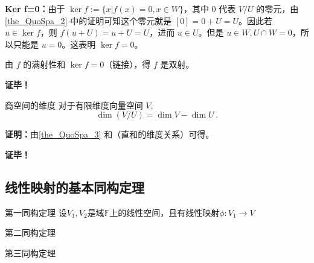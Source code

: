 \textbf{Ker f=0：}由于 $\ker f:=\{x|f(x)=0,x\in W\}$，其中 $0$ 代表 $V/U$ 的零元，由\autoref{the_QuoSpa_2} 中的证明可知这个零元就是 $[0]=0+U=U$。因此若 $u\in\ker f$，则 $f(u+U)=u+U=U$，进而 $u\in U$。但是 $u\in W,U\cap W=0$，所以只能是 $u=0$。这表明 $\ker f=0$。

由 $f$ 的满射性和 $\ker f=0$（链接），得 $f$ 是双射。

\textbf{证毕！}

\begin{corollary}{商空间的维度}
对于有限维度向量空间 $V$,
\begin{equation}\label{eq_QuoSpa_2}
\dim(V/U) = \dim V - \dim U~.
\end{equation}
\end{corollary}

\textbf{证明：}由\autoref{the_QuoSpa_3} 和（直和的维度关系）可得。

\textbf{证毕！}
\subsection{线性映射的基本同构定理}
\begin{theorem}{第一同构定理}
设$V_1,V_2$是域$\mathbb F$上的线性空间，且有线性映射$\phi:V_1\rightarrow V$
\end{theorem}


\begin{theorem}{第二同构定理}

\end{theorem}
\begin{theorem}{第三同构定理}

\end{theorem}
\begin{corollary}{}

\end{corollary}






